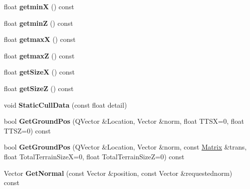 \begin{DoxyCompactItemize}
\item 
float {\bfseries getminX} () const \hypertarget{classQuadTree_afadaca606f7cfb62b1bfaf894de6363b}{}\label{classQuadTree_afadaca606f7cfb62b1bfaf894de6363b}

\item 
float {\bfseries getminZ} () const \hypertarget{classQuadTree_a7d0d259f8d98535fa969794917763e91}{}\label{classQuadTree_a7d0d259f8d98535fa969794917763e91}

\item 
float {\bfseries getmaxX} () const \hypertarget{classQuadTree_af0591ccd3f89cac3b308958f159e99b1}{}\label{classQuadTree_af0591ccd3f89cac3b308958f159e99b1}

\item 
float {\bfseries getmaxZ} () const \hypertarget{classQuadTree_a82279d324bc7f4e5ff1c0bb27e956eaf}{}\label{classQuadTree_a82279d324bc7f4e5ff1c0bb27e956eaf}

\item 
float {\bfseries get\+SizeX} () const \hypertarget{classQuadTree_a67fb3f0333e9343e52e101f7977bcb15}{}\label{classQuadTree_a67fb3f0333e9343e52e101f7977bcb15}

\item 
float {\bfseries get\+SizeZ} () const \hypertarget{classQuadTree_a0e57918a9fdfa5e22b3be44241f58019}{}\label{classQuadTree_a0e57918a9fdfa5e22b3be44241f58019}

\item 
void {\bfseries Static\+Cull\+Data} (const float detail)\hypertarget{classQuadTree_ab8d3a3429afc8665e3d223947391539f}{}\label{classQuadTree_ab8d3a3429afc8665e3d223947391539f}

\item 
bool {\bfseries Get\+Ground\+Pos} (Q\+Vector \&Location, Vector \&norm, float T\+T\+SX=0, float T\+T\+SZ=0) const \hypertarget{classQuadTree_a9b091ec4fee8842dde296c0fb1fa83e0}{}\label{classQuadTree_a9b091ec4fee8842dde296c0fb1fa83e0}

\item 
bool {\bfseries Get\+Ground\+Pos} (Q\+Vector \&Location, Vector \&norm, const \hyperlink{classMatrix}{Matrix} \&trans, float Total\+Terrain\+SizeX=0, float Total\+Terrain\+SizeZ=0) const \hypertarget{classQuadTree_a60954dce3c0ea10b71602b3bf1686f8a}{}\label{classQuadTree_a60954dce3c0ea10b71602b3bf1686f8a}

\item 
Vector {\bfseries Get\+Normal} (const Vector \&position, const Vector \&requestednorm) const \hypertarget{classQuadTree_adbdf0de4d109c8733cd0ba401a3f801c}{}\label{classQuadTree_adbdf0de4d109c8733cd0ba401a3f801c}

\end{DoxyCompactItemize}
